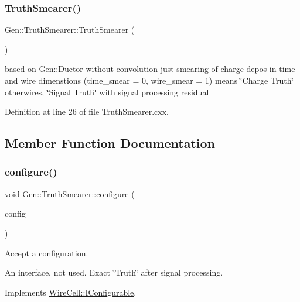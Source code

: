 \subsubsection{\texorpdfstring{Truth\+Smearer()}{TruthSmearer()}}
{\footnotesize\ttfamily Gen\+::\+Truth\+Smearer\+::\+Truth\+Smearer (\begin{DoxyParamCaption}{ }\end{DoxyParamCaption})}

based on \hyperlink{class_wire_cell_1_1_gen_1_1_ductor}{Gen\+::\+Ductor} without convolution just smearing of charge depos in time and wire dimenstions (time\+\_\+smear = 0, wire\+\_\+smear = 1) means \char`\"{}\+Charge Truth\char`\"{} otherwires, \char`\"{}\+Signal Truth\char`\"{} with signal processing residual 

Definition at line 26 of file Truth\+Smearer.\+cxx.



\subsection{Member Function Documentation}
\mbox{\label{class_wire_cell_1_1_gen_1_1_truth_smearer_a75e03e4110e01b8ff31ad3aba5e7804d}} 
\subsubsection{\texorpdfstring{configure()}{configure()}}
{\footnotesize\ttfamily void Gen\+::\+Truth\+Smearer\+::configure (\begin{DoxyParamCaption}\item[{const \hyperlink{namespace_wire_cell_a9f705541fc1d46c608b3d32c182333ee}{Wire\+Cell\+::\+Configuration} \&}]{config }\end{DoxyParamCaption})\hspace{0.3cm}{\ttfamily [virtual]}}



Accept a configuration. 

An interface, not used. Exact \char`\"{}\+Truth\char`\"{} after signal processing. 

Implements \hyperlink{class_wire_cell_1_1_i_configurable_a57ff687923a724093df3de59c6ff237d}{Wire\+Cell\+::\+I\+Configurable}.



